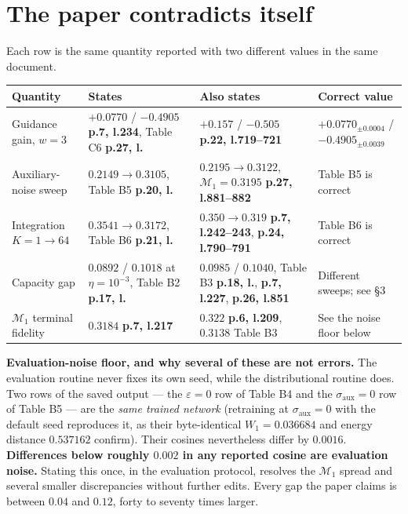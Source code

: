 \documentclass[11pt]{article}
\newcommand{\M}{\mathcal M}
\newcommand{\pl}[2]{\textbf{p.#1, l.#2}}
\begin{document}
\section{The paper contradicts itself}

Each row is the same quantity reported with two different values in the same document.

\begin{longtable}{@{}p{}p{}p{}p{}@{}}
\toprule
Quantity & States & Also states & Correct value\\
\midrule
\endhead
Guidance gain, $w=3$ &
$+0.0770$ / $-0.4905$ \pl{7}{234}, Table C6 \pl{27}{} &
$+0.157$ / $-0.505$ \pl{22}{719--721} &
$+0.0770_{\pm0.0004}$ / $-0.4905_{\pm0.0039}$\\
\addlinespace
Auxiliary-noise sweep &
$0.2149\!\to\!0.3105$, Table B5 \pl{20}{} &
$0.2195\!\to\!0.3122$, $\M_1=0.3195$ \pl{27}{881--882} &
Table B5 is correct\\
\addlinespace
Integration $K\!=\!1\!\to\!64$ &
$0.3541\!\to\!0.3172$, Table B6 \pl{21}{} &
$0.350\!\to\!0.319$ \pl{7}{242--243}, \pl{24}{790--791} &
Table B6 is correct\\
\addlinespace
Capacity gap &
$0.0892$ / $0.1018$ at $\eta{=}10^{-3}$, Table B2 \pl{17}{} &
$0.0985$ / $0.1040$, Table B3 \pl{18}{}, \pl{7}{227}, \pl{26}{851} &
Different sweeps; see \S3\\
\addlinespace
$\M_1$ terminal fidelity &
$0.3184$ \pl{7}{217} &
$0.322$ \pl{6}{209}, $0.3138$ Table B3 &
See the noise floor below\\
\bottomrule
\end{longtable}

\textbf{Evaluation-noise floor, and why several of these are not errors.} The evaluation routine
never fixes its own seed, while the distributional routine does. Two rows of the saved output ---
the $\varepsilon=0$ row of Table B4 and the $\sigma_{\mathrm{aux}}=0$ row of Table B5 --- are the
\emph{same trained network} (retraining at $\sigma_{\mathrm{aux}}=0$ with the default seed
reproduces it, as their byte-identical $W_1=0.036684$ and energy distance $0.537162$ confirm).
Their cosines nevertheless differ by $0.0016$. \textbf{Differences below roughly $0.002$ in any
reported cosine are evaluation noise.} Stating this once, in the evaluation protocol, resolves the
$\M_1$ spread and several smaller discrepancies without further edits. Every gap the paper claims
is between $0.04$ and $0.12$, forty to seventy times larger.
\end{document}
